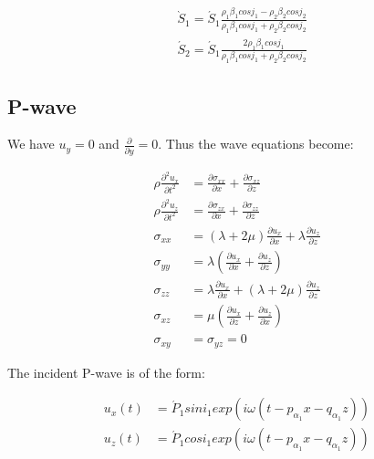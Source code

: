 \documentclass[main.tex]{subfiles}
\begin{document}
\begin{equation}
\begin{split}
& \grave S_1 = \acute S_1 \frac{\rho_1 \beta_1 cos j_1 - \rho_2 \beta_2 cos j_2}{\rho_1 \beta_1 cos j_1 + \rho_2 \beta_2 cos j_2} \\
& \acute S_2 = \acute S_1 \frac{2 \rho_1 \beta_1 cos j_1}{\rho_1 \beta_1 cos j_1 + \rho_2 \beta_2 cos j_2}
\end{split}
\end{equation}

\subsection{P-wave}

We have $u_y = 0$ and $\frac{\partial}{\partial y} = 0$. Thus the wave equations become:

\begin{equation}
\begin{split}
\rho \frac{\partial ^2 u_x}{\partial t^2} & = \frac{\partial \sigma_{xx}}{\partial x} + \frac{\partial \sigma_{xz}}{\partial z} \\
\rho \frac{\partial ^2 u_z}{\partial t^2} & = \frac{\partial \sigma_{zx}}{\partial x} + \frac{\partial \sigma_{zz}}{\partial z} \\
\sigma_{xx} & = (\lambda + 2 \mu) \frac{\partial u_x}{\partial x} + \lambda \frac{\partial u_z}{\partial z} \\
\sigma_{yy} & = \lambda (\frac{\partial u_x}{\partial x} + \frac{\partial u_z}{\partial z}) \\
\sigma_{zz} & = \lambda \frac{\partial u_x}{\partial x} + (\lambda + 2 \mu) \frac{\partial u_z}{\partial z} \\
\sigma_{xz} & = \mu (\frac{\partial u_x}{\partial z} + \frac{\partial u_z}{\partial x}) \\
\sigma_{xy} & = \sigma_{yz} = 0
\end{split}
\end{equation}

The incident P-wave is of the form:

\begin{equation}
\begin{split}
u_x (t) & = \acute P_1 sin i_1 exp (i \omega (t - p_{\alpha_1} x - q_{\alpha_1} z)) \\
u_z (t) & = \acute P_1 cos i_1 exp (i \omega (t - p_{\alpha_1} x - q_{\alpha_1} z))
\end{split}
\end{equation}
\end{document}
